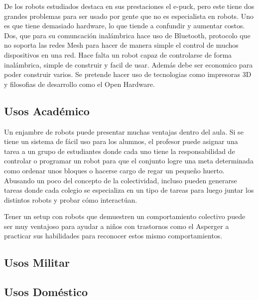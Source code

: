 De los robots estudiados destaca en sus prestaciones el e-puck, pero este tiene dos grandes problemas para ser usado por gente que no es especialista en robots. Uno es que tiene demasiado hardware, lo que tiende a confundir y aumentar costos. Dos, que para su comuncación inalámbrica hace uso de Bluetooth, protocolo que no soporta las redes Mesh para hacer de manera simple el control de muchos dispositivos en una red. Hace falta un robot capaz de controlarse de forma inalámbrica, simple de construir y facil de usar. Además debe ser economico para poder construir varios. Se pretende hacer uso de tecnologias como impresoras 3D y filosofias de desarrollo como el Open Hardware.



\subsection{Usos Académico}

Un enjambre de robots puede presentar muchas ventajas dentro del aula. Si se tiene un sistema de fácil uso para los alumnos, el profesor puede asignar una tarea a un grupo de estudiantes donde cada uno tiene la responsabilidad de controlar o programar un robot para que el conjunto logre una meta determinada como ordenar unos bloques o hacerse cargo de regar un pequeño huerto. Abusando un poco del concepto de la colectividad, incluso pueden generarse tareas donde cada colegio se especializa en un tipo de tareas para luego juntar los distintos robots y probar cómo interactúan.

Tener un setup con robots que demuestren un comportamiento colectivo puede ser muy ventajoso para ayudar a niños con trastornos como el Asperger a practicar sus habilidades para reconocer estos mismo comportamientos.

\subsection{Usos Militar}

\subsection{Usos Doméstico}

